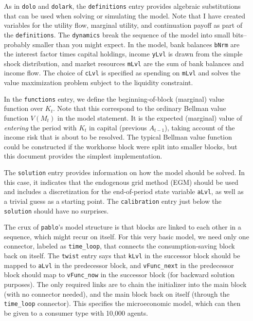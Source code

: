 \documentclass[12pt,pdftex,letterpaper]{article}
\begin{document}
As in \texttt{dolo} and \texttt{dolark}, the \texttt{definitions} entry provides algebraic substitutions that can be used when solving or simulating the model. Note that I have created variables for the utility flow, marginal utility, and continuation payoff as part of the \texttt{definitions}. The \texttt{dynamics} break the sequence of the model into small bits-- probably smaller than you might expect. In the model, bank balances \texttt{bNrm} are the interest factor times capital holdings, income \texttt{yLvl} is drawn from the simple shock distribution, and market resources \texttt{mLvl} are the sum of bank balances and income flow. The choice of \texttt{cLvl} is specified as spending on \texttt{mLvl} and solves the value maximization problem subject to the liquidity constraint.

In the \texttt{functions} entry, we define the beginning-of-block (marginal) value function over $K_t$. Note that this  correspond to the ordinary Bellman value function $V(M_t)$ in the model statement. It is the expected (marginal) value of \textit{entering} the period with $K_t$ in capital (previous $A_{t-1}$), taking account of the income risk that is about to be resolved. The typical Bellman value function could be constructed if the workhorse block were split into smaller blocks, but this document provides the simplest implementation.

The \texttt{solution} entry provides information on how the model should be solved. In this case, it indicates that the endogenous grid method (EGM) should be used and includes a discretization for the end-of-period state variable \texttt{aLvl}, as well as a trivial guess as a starting point. The \texttt{calibration} entry just below the \texttt{solution} should have no surprises.

The crux of \texttt{pablo}'s model structure is that blocks are linked to each other in a sequence, which might recur on itself. For this very basic model, we need only one connector, labeled as \texttt{time\_loop}, that connects the consumption-saving block back on itself. The \texttt{twist} entry says that \texttt{kLvl} in the successor block should be mapped to \texttt{aLvl} in the predecessor block, and \texttt{vFunc\_next} in the predecessor block should map to \texttt{vFunc\_now} in the successor block (for backward solution purposes). The only required links are to chain the initializer into the main block (with no connector needed), and the main block back on itself (through the \texttt{time\_loop} connector). This specifies the microeconomic model, which can then be given to a consumer type with 10,000 agents.
\end{document}
